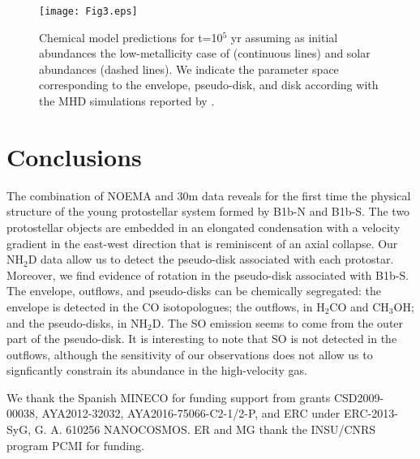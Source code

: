 \documentclass[letter]{aa}
\begin{document}
\begin{figure}[t!]
\hspace{-0.0cm}\texttt{[image: Fig3.eps]}\\

\caption{Chemical model predictions for t=10$^5$ yr assuming as initial abundances the low-metallicity 
case of \citet{Wiebe03} (continuous lines) and solar abundances (dashed lines). We indicate the parameter 
space corresponding to the envelope, pseudo-disk, and 
disk according with the MHD simulations reported by \citet{Gerin16}.
}
 \label{Fig3}
\end{figure}


  
\section{Conclusions}
   The combination of NOEMA and 30m data reveals for the first time the physical structure 
   of the young protostellar system
   formed by B1b-N and B1b-S. The two protostellar objects are embedded in an elongated 
condensation with a velocity gradient in the east-west direction
that is reminiscent of
an axial collapse. Our NH$_2$D data allow us to detect the pseudo-disk associated with each protostar. Moreover,
we find evidence of rotation in the pseudo-disk associated with B1b-S.
The envelope, outflows, and pseudo-disks can be chemically segregated:
the envelope is detected in the CO isotopologues; the outflows, in H$_2$CO and CH$_3$OH; and the pseudo-disks,
in NH$_2$D. 
The SO emission seems to come from the 
outer part of the pseudo-disk. It is interesting to note that SO is not detected in the outflows, 
although the sensitivity of our observations does not allow us
to signficantly constrain its abundance
in the high-velocity gas.



\begin{acknowledgements}

We thank the Spanish MINECO for funding support from
grants CSD2009-00038, AYA2012-32032, AYA2016-75066-C2-1/2-P, and ERC under ERC-2013-SyG, G. A. 610256 NANOCOSMOS.
ER and MG thank the INSU/CNRS program PCMI for funding.


\end{acknowledgements}
\end{document}
